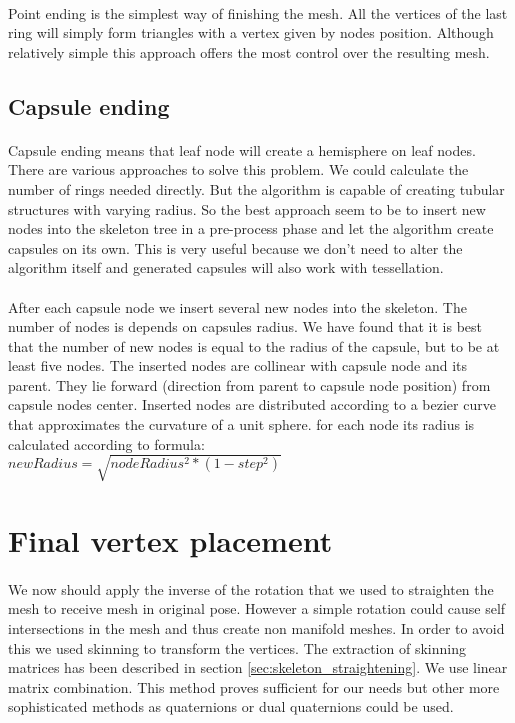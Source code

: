 \paragraph{}
Point ending is the simplest way of finishing the mesh. All the vertices of the last ring will simply form triangles with a vertex given by nodes position. Although relatively simple this approach offers the most control over the resulting mesh.

\subsection{Capsule ending}
\paragraph{}
Capsule ending means that leaf node will create a hemisphere on leaf nodes. There are various approaches to solve this problem. We could calculate the number of rings needed directly. But the algorithm is capable of creating tubular structures with varying radius. So the best approach seem to be to insert new nodes into the skeleton tree in a pre-process phase and let the algorithm create capsules on its own. This is very useful because we don't need to alter the algorithm itself and generated capsules will also work with tessellation.
\paragraph{}
After each capsule node we insert several new nodes into the skeleton. The number of nodes is depends on capsules radius. We have found that it is best that the number of new nodes is equal to the radius of the capsule, but to be at least five nodes. The inserted nodes are collinear with capsule node and its parent. They lie forward (direction from parent to capsule node position) from capsule nodes center. Inserted nodes are distributed according to a bezier curve that approximates the curvature of a unit sphere. for each node its radius is calculated according to formula:
\\
$newRadius = \sqrt{nodeRadius^{2} * (1 - step^{2})}$

\section{Final vertex placement}

\paragraph{}
We now should apply the inverse of the rotation that we used to straighten the mesh to receive mesh in original pose. However a simple rotation could cause self intersections in the mesh and thus create non manifold meshes. In order to avoid this we used skinning to transform the vertices. The extraction of skinning matrices has been described in section \ref{sec:skeleton_straightening}. We use linear matrix combination. This method proves sufficient for our needs but other more sophisticated methods as quaternions or dual quaternions could be used.
